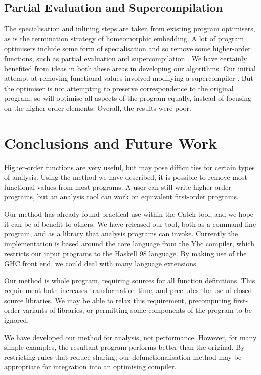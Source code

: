 \documentclass[preprint]{sigplanconf}
\begin{document}
\subsection{Partial Evaluation and Supercompilation}

The specialisation and inlining steps are taken from existing program optimisers, as is the termination strategy of homeomorphic embedding. A lot of program optimisers include some form of specialisation and so remove some higher-order functions, such as partial evaluation \cite{jones:partial_evaluation} and supercompilation \cite{supercompilation}. We have certainly benefited from ideas in both these areas in developing our algorithms. Our initial attempt at removing functional values involved modifying a supercompiler \cite{me:supero}. But the optimiser is not attempting to preserve correspondence to the original program, so will optimise all aspects of the program equally, instead of focusing on the higher-order elements. Overall, the results were poor.

\section{Conclusions and Future Work}
\label{sec:conclusion}

Higher-order functions are very useful, but may pose difficulties for certain types of analysis. Using the method we have described, it is possible to remove most functional values from most programs. A user can still write higher-order programs, but an analysis tool can work on equivalent first-order programs.

Our method has already found practical use within the Catch tool, and we hope it can be of benefit to others. We have released our tool, both as a command line program, and as a library that analysis programs can invoke. Currently the implementation is based around the core language from the Yhc compiler, which restricts our input programs to the Haskell 98 language. By making use of the GHC front end, we could deal with many language extensions.

Our method is whole program, requiring sources for all function definitions. This requirement both increases transformation time, and precludes the use of closed source libraries. We may be able to relax this requirement, precomputing first-order variants of libraries, or permitting some components of the program to be ignored.

We have developed our method for analysis, not performance. However, for many simple examples, the resultant program performs better than the original. By restricting rules that reduce sharing, our defunctionalisation method may be appropriate for integration into an optimising compiler.
\end{document}
